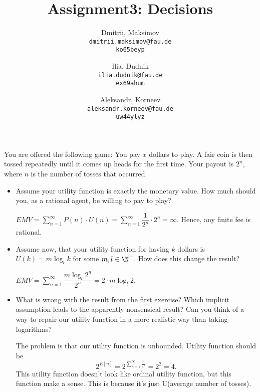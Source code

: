 \documentclass{homework}
\title{Assignment3: Decisions}
\author{
  Dmitrii, Maksimov\\
  \texttt{dmitrii.maksimov@fau.de} \\
  \texttt{ko65beyp}
  \and
  Ilia, Dudnik\\
  \texttt{ilia.dudnik@fau.de}\\
  \texttt{ex69ahum}
  \and
  Aleksandr, Korneev\\
  \texttt{aleksandr.korneev@fau.de}\\
  \texttt{uw44ylyz}
}
\begin{document}
\maketitle

You are offered the following game: You pay $x$ dollars to play. A fair coin is then tossed repeatedly until it comes up heads for the first time. Your payout is $2^n$, where $n$ is the number of tosses that occurred.
\begin{itemize}
	\item Assume your utility function is exactly the monetary value. How much should you, as a rational agent, be willing to pay to play?

	$EMV=\displaystyle\sum_{n=1}^{\infty}P(n)\cdot U(n)=\sum_{n=1}^{\infty}\dfrac{1}{2^n}\cdot 2^n=\infty$. Hence, any finite fee is rational.
	\item Assume now, that your utility function for having $k$ dollars is $U(k) = m\log_lk$ for some $m, l \in \N^+$. How does this change the result?

	$EMV=\displaystyle\sum_{n=1}^{\infty}\dfrac{m\log_l2^n}{2^n} = 2\cdot m\log_l2$. 

	\item What is wrong with the result from the first exercise? Which implicit assumption leads to the apparently nonsensical result? Can you think of a way to repair our utility function in a more realistic way than taking logarithms?

	The problem is that our utility function is unbounded.  Utility function should be \[2^{E[n]}=2^{\sum_{n=1}^{\infty}\frac{n}{2^n}}= 2^2=4.\]This utility function doesn't look like ordinal utility function, but this function make a sense. This is because it's just U(average number of tosses).
\end{itemize}
\end{document}
